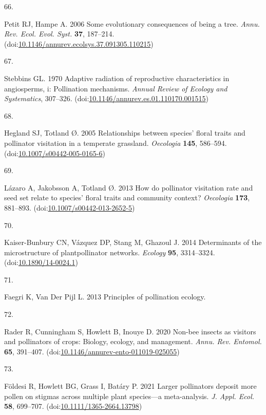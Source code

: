 \documentclass[
  12pt,
  a4paper,
]{article}
\newlength{\cslhangindent}
\newlength{\csllabelwidth}
\newlength{\cslentryspacingunit} %
\newenvironment{CSLReferences}[2] %
 {%
  \setlength{\parindent}{0pt}
  \ifodd #1
  \let\oldpar\par
  \def\par{\hangindent=\cslhangindent\oldpar}
  \fi
  \setlength{\parskip}{#2\cslentryspacingunit}
 }%
 {}
\newcommand{\CSLLeftMargin}[1]{\parbox[t]{\csllabelwidth}{#1}}
\newcommand{\CSLRightInline}[1]{\parbox[t]{\linewidth - \csllabelwidth}{#1}\break}
\begin{document}
\begin{CSLReferences}{0}{0}
\leavevmode{}%
\CSLLeftMargin{66. }
\CSLRightInline{Petit RJ, Hampe A. 2006 Some evolutionary consequences of being a tree. \emph{Annu. Rev. Ecol. Evol. Syst.} \textbf{37}, 187--214. (doi:\href{https://doi.org/10.1146/annurev.ecolsys.37.091305.110215}{10.1146/annurev.ecolsys.37.091305.110215})}

\leavevmode{}%
\CSLLeftMargin{67. }
\CSLRightInline{Stebbins GL. 1970 Adaptive radiation of reproductive characteristics in angiosperms, i: Pollination mechanisms. \emph{Annual Review of Ecology and Systematics}, 307--326. (doi:\href{https://doi.org/10.1146/annurev.es.01.110170.001515}{10.1146/annurev.es.01.110170.001515})}

\leavevmode{}%
\CSLLeftMargin{68. }
\CSLRightInline{Hegland SJ, Totland Ø. 2005 Relationships between species' floral traits and pollinator visitation in a temperate grassland. \emph{Oecologia} \textbf{145}, 586--594. (doi:\href{https://doi.org/10.1007/s00442-005-0165-6}{10.1007/s00442-005-0165-6})}

\leavevmode{}%
\CSLLeftMargin{69. }
\CSLRightInline{Lázaro A, Jakobsson A, Totland Ø. 2013 How do pollinator visitation rate and seed set relate to species' floral traits and community context? \emph{Oecologia} \textbf{173}, 881--893. (doi:\href{https://doi.org/10.1007/s00442-013-2652-5}{10.1007/s00442-013-2652-5})}

\leavevmode{}%
\CSLLeftMargin{70. }
\CSLRightInline{Kaiser-Bunbury CN, Vázquez DP, Stang M, Ghazoul J. 2014 Determinants of the microstructure of plant\textendash pollinator networks. \emph{Ecology} \textbf{95}, 3314--3324. (doi:\href{https://doi.org/10.1890/14-0024.1}{10.1890/14-0024.1})}

\leavevmode{}%
\CSLLeftMargin{71. }
\CSLRightInline{Faegri K, Van Der Pijl L. 2013 Principles of pollination ecology. }

\leavevmode{}%
\CSLLeftMargin{72. }
\CSLRightInline{Rader R, Cunningham S, Howlett B, Inouye D. 2020 Non-bee insects as visitors and pollinators of crops: Biology, ecology, and management. \emph{Annu. Rev. Entomol.} \textbf{65}, 391--407. (doi:\href{https://doi.org/10.1146/annurev-ento-011019-025055}{10.1146/annurev-ento-011019-025055})}

\leavevmode{}%
\CSLLeftMargin{73. }
\CSLRightInline{Földesi R, Howlett BG, Grass I, Batáry P. 2021 Larger pollinators deposit more pollen on stigmas across multiple plant species---a meta-analysis. \emph{J. Appl. Ecol.} \textbf{58}, 699--707. (doi:\href{https://doi.org/10.1111/1365-2664.13798}{10.1111/1365-2664.13798})}


\end{CSLReferences}
\end{document}
